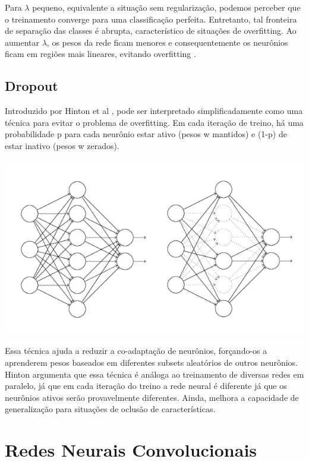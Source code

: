 \documentclass[
	12pt,				%
	oneside,			%
	a4paper,			%
	english,			%
	french,				%
	spanish,			%
	brazil,				%
	]{abntex2}
\begin{document}
 Para $\lambda$ pequeno, equivalente a situação sem regularização, podemos perceber que o treinamento converge para uma classificação perfeita. Entretanto, tal fronteira de separação das classes é abrupta, característico de situações de overfitting. Ao aumentar $\lambda$, os pesos da rede ficam menores e consequentemente os neurônios ficam em regiões mais lineares, evitando overfitting \cite{regularization}.

\section{Dropout}

Introduzido por Hinton et al \cite{dropout}, pode ser interpretado simplificadamente como uma técnica para evitar o problema de overfitting. Em cada iteração de treino, há uma probabilidade p para cada neurônio estar ativo (pesos w mantidos) e (1-p) de estar inativo (pesos w zerados). 

\begin{center}
	\includegraphics[scale=0.8]{dropout.png}
\end{center}

Essa técnica ajuda a reduzir a co-adaptação de neurônios, forçando-os a aprenderem pesos baseados em diferentes subsets aleatórios de outros neurônios. Hinton argumenta que essa técnica é análoga ao treinamento de diversas redes em paralelo, já que em cada iteração do treino a rede neural é diferente já que os neurônios ativos serão provavelmente diferentes. Ainda, melhora a capacidade de generalização para situações de oclusão de características.


\chapter{Redes Neurais Convolucionais}
\end{document}

